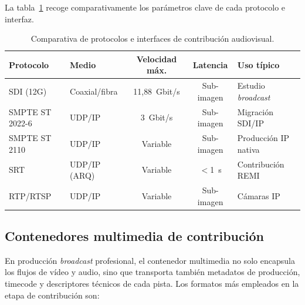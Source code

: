 La tabla~\ref{tab:contrib_interfaces} recoge comparativamente los parámetros clave
de cada protocolo e interfaz.

\begin{table}[H]
  \centering
  \caption{Comparativa de protocolos e interfaces de contribución audiovisual.}
  \label{tab:contrib_interfaces}
  \small
  \begin{tabularx}{\textwidth}{|l|l|c|c|X|}
    \hline
    \textbf{Protocolo} & \textbf{Medio} & \textbf{Velocidad máx.} & \textbf{Latencia} & \textbf{Uso típico} \\
    \hline
    SDI (12G)       & Coaxial/fibra & 11{,}88~Gbit/s & Sub-imagen & Estudio \textit{broadcast} \\
    SMPTE ST 2022-6 & UDP/IP        & 3~Gbit/s       & Sub-imagen & Migración SDI/IP  \\
    SMPTE ST 2110   & UDP/IP        & Variable       & Sub-imagen & Producción IP nativa \\
    SRT             & UDP/IP (ARQ)  & Variable       & $<$1~s     & Contribución REMI \\
    RTP/RTSP        & UDP/IP        & Variable       & Sub-imagen & Cámaras IP \\
    \hline
  \end{tabularx}
\end{table}

\subsection{Contenedores multimedia de contribución}

En producción \textit{broadcast} profesional, el contenedor multimedia no solo encapsula los
flujos de vídeo y audio, sino que transporta también metadatos de producción, timecode
y descriptores técnicos de cada pista. Los formatos más empleados en la etapa de
contribución son:

